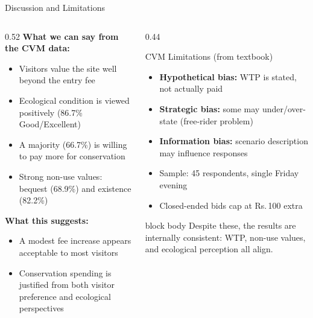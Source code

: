 \documentclass[10pt, aspectratio=169]{beamer}
\newcommand{\rupee}{\textrm{Rs.}\,}
\newcommand{\keyinsight}[1]{%
  \begin{beamercolorbox}[wd=\textwidth, sep=6pt, rounded=true]{block body}
    {\small #1}
  \end{beamercolorbox}%
}
\begin{document}
\begin{frame}{Discussion and Limitations}
    \begin{columns}[T]
        \begin{column}{0.52\textwidth}
            \textbf{What we can say from the CVM data:}
            \begin{itemize}
                    \item Visitors value the site well beyond the entry fee
                    \item Ecological condition is viewed positively (86.7\% Good/Excellent)
                    \item A majority (66.7\%) is willing to pay more for conservation
                    \item Strong non-use values: bequest (68.9\%) and existence (82.2\%)
            \end{itemize}

            \vspace{0.5em}
            \textbf{What this suggests:}
            \begin{itemize}
                \item A modest fee increase appears acceptable to most visitors
                \item Conservation spending is justified from both visitor preference and ecological perspectives
            \end{itemize}
        \end{column}
        \begin{column}{0.44\textwidth}
            \begin{alertblock}{CVM Limitations (from textbook)}
                \small
                \begin{itemize}
                    \item \textbf{Hypothetical bias:} WTP is stated, not actually paid
                    \item \textbf{Strategic bias:} some may under/over-state (free-rider problem)
                    \item \textbf{Information bias:} scenario description may influence responses
                    \item Sample: 45 respondents, single Friday evening
                    \item Closed-ended bids cap at \rupee 100 extra
                \end{itemize}
            \end{alertblock}

            \vspace{0.3em}
            \keyinsight{Despite these, the results are internally consistent: WTP, non-use values, and ecological perception all align.}
        \end{column}
    \end{columns}
\end{frame}
\end{document}
